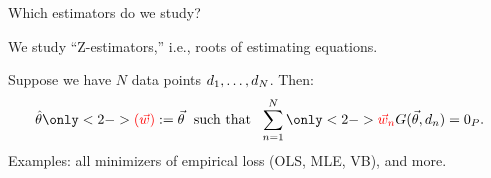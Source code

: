 

\begin{frame}[t]{Which estimators do we study?}

We study  ``Z-estimators,'' i.e., roots of estimating equations.

Suppose we have $N$ data points $d_{1}, \ldots, d_{N}$.  Then:
%
\begin{align*}
%
\thetahat \only<2->{\color{red} (\w) \color{black}} :=
\vec\theta \,\, \textrm{ such that } \,\,
\sumn
\only<2->{ \color{red} \w_{n} \color{black}}
G(\vec\theta, \d_{n}) =  \zP .
%
\end{align*}
%
Examples: all minimizers of empirical loss (OLS, MLE, VB), and more.



\end{frame}





